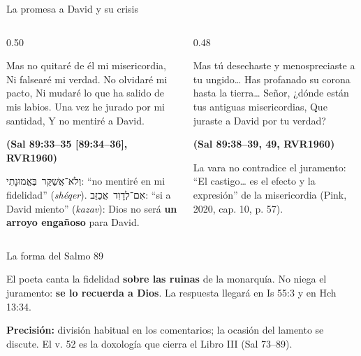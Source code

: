 \documentclass[hyperref={bookmarks=false},aspectratio=169]{beamer}
\newcommand{\heb}[1]{\mbox{\foreignlanguage{hebrew}{#1}}}
\newcommand{\fuente}[1]{\par\hfill{\upshape\bfseries\footnotesize\textcolor{azul}{#1}}}
\newcommand{\destacar}[1]{\textbf{\textcolor{azul}{#1}}}
\newcommand{\precision}[1]{{\footnotesize\color{gris}\textbf{Precisión:} #1}}
\begin{document}
\begin{frame}{La promesa a David y su crisis}
\begin{columns}[t,onlytextwidth]
\begin{column}{0.50\textwidth}
\begin{cita}Mas no quitaré de él mi misericordia, Ni falsearé mi verdad. No olvidaré mi pacto, Ni mudaré lo que ha salido de mis labios. Una vez he jurado por mi santidad, Y no mentiré a David.\fuente{(Sal 89:33--35 [89:34--36], RVR1960)}\end{cita}
\scriptsize \heb{וְלֹא־אֲשַׁקֵּר בֶּאֱמוּנָתִי}: ``no mentiré en mi fidelidad'' (\emph{shéqer}). \heb{אִם־לְדָוִד אֲכַזֵּב}: ``si a David miento'' (\emph{kazav}): Dios no será \destacar{un arroyo engañoso} para David.
\end{column}
\begin{column}{0.48\textwidth}
\begin{cita}Mas tú desechaste y menospreciaste a tu ungido\ldots{} Has profanado su corona hasta la tierra\ldots{} Señor, ¿dónde están tus antiguas misericordias, Que juraste a David por tu verdad?\fuente{(Sal 89:38--39, 49, RVR1960)}\end{cita}
\scriptsize La vara no contradice el juramento: ``El castigo\ldots{} es el efecto y la expresión'' de la misericordia (Pink, 2020, cap. 10, p. 57).
\end{column}
\end{columns}
\end{frame}

\begin{frame}{La forma del Salmo 89}
\centering
{}\par\medskip
\small El poeta canta la fidelidad \destacar{sobre las ruinas} de la monarquía. No niega el juramento: \destacar{se lo recuerda a Dios}. La respuesta llegará en Is 55:3 y en Hch 13:34.\par\smallskip
\precision{división habitual en los comentarios; la ocasión del lamento se discute. El v. 52 es la doxología que cierra el Libro III (Sal 73--89).}
\end{frame}
\end{document}
